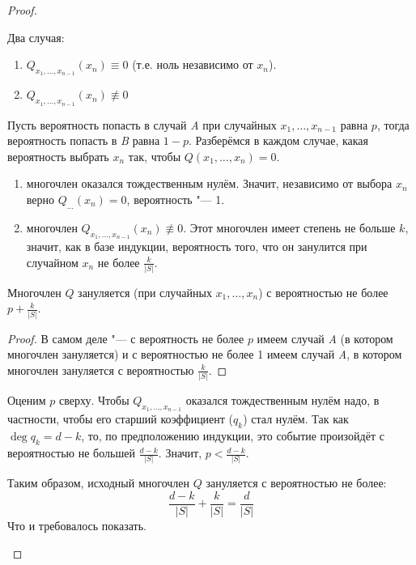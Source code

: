 \begin{proof}
\begin{description}
				Два случая:
				\begin{enumerate}[label=\emph{\Alph*}.]
					\item $Q_{x_1, \dots, x_{n-1}}(x_n)\equiv 0$ (т.е. ноль независимо от $x_n$).
					\item $Q_{x_1, \dots, x_{n-1}}(x_n)\nequiv 0$
				\end{enumerate}
				Пусть вероятность попасть в случай \emph{A} при случайных $x_1, \dots, x_{n-1}$ равна $p$, тогда вероятность попасть в \emph{B} равна $1-p$.
				Разберёмся в каждом случае, какая вероятность выбрать $x_n$ так, чтобы $Q(x_1, \dots, x_n)=0$.
				\begin{enumerate}[label=\emph{\Alph*}.]
					\item
						многочлен оказался тождественным нулём.
						Значит, независимо от выбора $x_n$ верно $Q_{\dots}(x_n)=0$, вероятность "--- 1.
					\item
						многочлен $Q_{x_1, \dots, x_{n-1}}(x_n) \nequiv 0$.
						Этот многочлен имеет степень не больше $k$, значит, как в базе индукции, вероятность того, что он занулится
						при случайном $x_n$ не более $\frac{k}{|S|}$.
				\end{enumerate}
				\begin{assertion}
					Многочлен $Q$ зануляется (при случайных $x_1, \dots, x_n$) с вероятностью не более $p + \frac{k}{|S|}$.
				\end{assertion}
				\begin{proof}
					В самом деле "--- с вероятность не более $p$ имеем случай \emph{A} (в котором многочлен зануляется) и с вероятностью не более 1 имеем
					случай \emph{A}, в котором многочлен зануляется с вероятностью $\frac{k}{|S|}$.
				\end{proof}

				Оценим $p$ сверху.
				Чтобы $Q_{x_1, \dots, x_{n-1}}$ оказался тождественным нулём надо, в частности, чтобы его старший коэффициент ($q_k$) стал нулём.
				Так как $\deg q_k = d - k$, то, по предположению индукции, это событие произойдёт с вероятностью не большей $\frac{d-k}{|S|}$.
				Значит, $p < \frac{d-k}{|S|}$.

				Таким образом, исходный многочлен $Q$ зануляется с вероятностью не более:
				\[ \frac{d-k}{|S|} + \frac{k}{|S|} = \frac{d}{|S|} \]
				Что и требовалось показать.
		\end{description}
	\end{proof}

